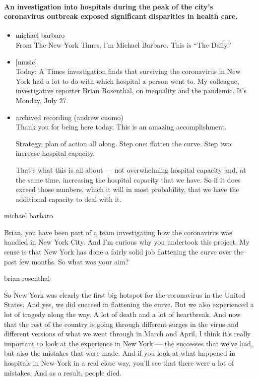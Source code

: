 \hypertarget{an-investigation-into-hospitals-during-the-peak-of-the-citys-coronavirus-outbreak-exposed-significant-disparities-in-health-care}{%
\paragraph{An investigation into hospitals during the peak of the city's
coronavirus outbreak exposed significant disparities in health
care.}\label{an-investigation-into-hospitals-during-the-peak-of-the-citys-coronavirus-outbreak-exposed-significant-disparities-in-health-care}}

\begin{itemize}
\item
  michael barbaro\\
  From The New York Times, I'm Michael Barbaro. This is ``The Daily.''
\item
  {[}music{]}\\
  Today: A Times investigation finds that surviving the coronavirus in
  New York had a lot to do with which hospital a person went to. My
  colleague, investigative reporter Brian Rosenthal, on inequality and
  the pandemic. It's Monday, July 27.
\item
  archived recording (andrew cuomo)\\
  Thank you for being here today. This is an amazing accomplishment.

  Strategy, plan of action all along. Step one: flatten the curve. Step
  two: increase hospital capacity.

  That's what this is all about --- not overwhelming hospital capacity
  and, at the same time, increasing the hospital capacity that we have.
  So if it does exceed those numbers, which it will in most probability,
  that we have the additional capacity to deal with it.
\end{itemize}

michael barbaro

Brian, you have been part of a team investigating how the coronavirus
was handled in New York City. And I'm curious why you undertook this
project. My sense is that New York has done a fairly solid job
flattening the curve over the past few months. So what was your aim?

brian rosenthal

So New York was clearly the first big hotspot for the coronavirus in the
United States. And yes, we did succeed in flattening the curve. But we
also experienced a lot of tragedy along the way. A lot of death and a
lot of heartbreak. And now that the rest of the country is going through
different surges in the virus and different versions of what we went
through in March and April, I think it's really important to look at the
experience in New York --- the successes that we've had, but also the
mistakes that were made. And if you look at what happened in hospitals
in New York in a real close way, you'll see that there were a lot of
mistakes. And as a result, people died.

